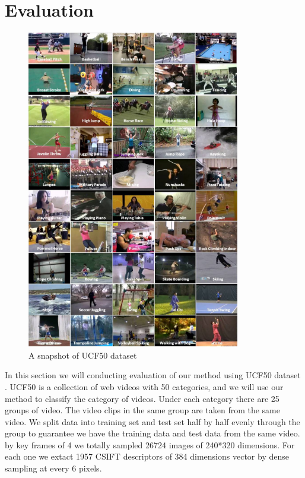 \documentclass{sig-alternate-05-2015}
\begin{document}
\section{Evaluation}\label{sec:eval}
\begin{figure}[h]
\centering
  \includegraphics[scale=0.5]{fig/ucf50.png}
  \caption{A snapshot of UCF50 dataset}
  \label{fig:ucf50}
\end{figure}
In this section we will conducting evaluation of our method using UCF50 dataset \cite{ucf50}.
UCF50 is a collection of web videos with 50 categories, and  we will use our method to classify the category of videos. Under each category there are 25 groups of video. The video clips in the same  group are taken from the same video. 
We split data into training set and test set half by half evenly through the group to guarantee we have the training data and test data from the same video. by key frames of 4 we totally sampled 26724 images of 240*320 dimensions. For each one we extact 1957 CSIFT descriptors of 384 dimensions vector by dense sampling at every 6 pixels.
\end{document}
